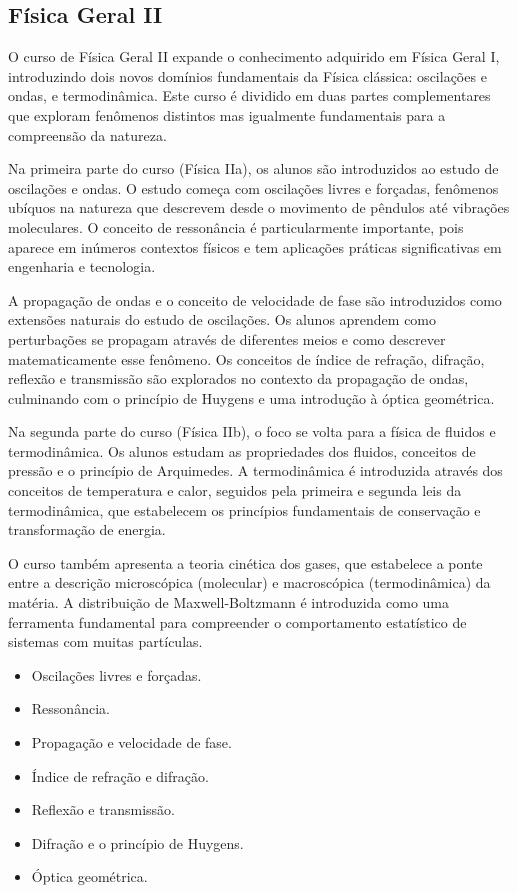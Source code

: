 \documentclass[a4paper, 12pt]{article}
\newcounter{fis}
\newcounter{mat}
\begin{document}
\subsection{Física Geral II}
\label{fis004a}
\label{fis004b}

O curso de Física Geral II expande o conhecimento adquirido em Física Geral I,
introduzindo dois novos domínios fundamentais da Física clássica: oscilações e ondas, e
termodinâmica. Este curso é dividido em duas partes complementares que exploram
fenômenos distintos mas igualmente fundamentais para a compreensão da natureza.

Na primeira parte do curso (Física IIa), os alunos são introduzidos ao estudo de
oscilações e ondas. O estudo começa com oscilações livres e forçadas, fenômenos
ubíquos na natureza que descrevem desde o movimento de pêndulos até vibrações
moleculares. O conceito de ressonância é particularmente importante, pois aparece em
inúmeros contextos físicos e tem aplicações práticas significativas em engenharia e
tecnologia.

A propagação de ondas e o conceito de velocidade de fase são introduzidos como
extensões naturais do estudo de oscilações. Os alunos aprendem como perturbações se
propagam através de diferentes meios e como descrever matematicamente esse fenômeno. Os
conceitos de índice de refração, difração, reflexão e transmissão são explorados no
contexto da propagação de ondas, culminando com o princípio de Huygens e uma introdução
à óptica geométrica.

Na segunda parte do curso (Física IIb), o foco se volta para a física de fluidos e
termodinâmica. Os alunos estudam as propriedades dos fluidos, conceitos de pressão e o
princípio de Arquimedes. A termodinâmica é introduzida através dos conceitos de
temperatura e calor, seguidos pela primeira e segunda leis da termodinâmica, que
estabelecem os princípios fundamentais de conservação e transformação de energia.

O curso também apresenta a teoria cinética dos gases, que estabelece a ponte entre a
descrição microscópica (molecular) e macroscópica (termodinâmica) da matéria. A
distribuição de Maxwell-Boltzmann é introduzida como uma ferramenta fundamental para
compreender o comportamento estatístico de sistemas com muitas partículas.

\begin{tcolorbox}[title=Ementa Física IIa:]
    \begin{itemize}
        \item Oscilações livres e forçadas.
        \item Ressonância.
        \item Propagação e velocidade de fase.
        \item Índice de refração e difração.
        \item Reflexão e transmissão.
        \item Difração e o princípio de Huygens.
        \item Óptica geométrica.
    \end{itemize}
\end{tcolorbox}
\end{document}
